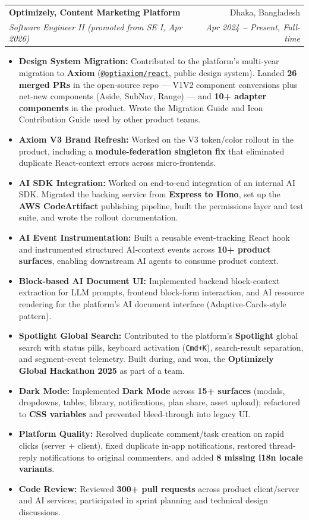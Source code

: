 \documentclass[letterpaper,11pt]{article}
\makeatletter
\newcommand{\resumeItem}[1]{
  \item\small{{#1 \vspace{-2pt}}}
}
\newcommand{\resumeSubheading}[4]{
  \vspace{-2pt}\item
    \begin{tabular*}{0.97\textwidth}[t]{l@{\extracolsep{\fill}}r}
      \textbf{#1} & #2 \\
      \textit{\small#3} & \textit{\small #4} \\
    \end{tabular*}\vspace{-7pt}
}
\newcommand{\resumeItemListStart}{\begin{itemize}}
\newcommand{\resumeItemListEnd}{\end{itemize}\vspace{-5pt}}
\makeatother
\begin{document}
    \resumeSubheading
      {Optimizely, Content Marketing Platform}{Dhaka, Bangladesh}
      {Software Engineer II \textnormal{(promoted from SE I, Apr 2026)}}{Apr 2024 \textbf{--} Present, Full-time}
      \resumeItemListStart
        \resumeItem{\textbf{Design System Migration:} Contributed to the platform's multi-year migration to \textbf{Axiom} (\href{https://github.com/optimizely-axiom/optiaxiom}{\color{blue}\texttt{@optiaxiom/react}}, public design system). Landed \textbf{26 merged PRs} in the open-source repo --- V1{\textrightarrow}V2 component conversions plus net-new components (Aside, SubNav, Range) --- and \textbf{10+ adapter components} in the product. Wrote the Migration Guide and Icon Contribution Guide used by other product teams.}
        \resumeItem{\textbf{Axiom V3 Brand Refresh:} Worked on the V3 token/color rollout in the product, including a \textbf{module-federation singleton fix} that eliminated duplicate React-context errors across micro-frontends.}
        \resumeItem{\textbf{AI SDK Integration:} Worked on end-to-end integration of an internal AI SDK. Migrated the backing service from \textbf{Express to Hono}, set up the \textbf{AWS CodeArtifact} publishing pipeline, built the permissions layer and test suite, and wrote the rollout documentation.}
        \resumeItem{\textbf{AI Event Instrumentation:} Built a reusable event-tracking React hook and instrumented structured AI-context events across \textbf{10+ product surfaces}, enabling downstream AI agents to consume product context.}
        \resumeItem{\textbf{Block-based AI Document UI:} Implemented backend block-context extraction for LLM prompts, frontend block-form interaction, and AI resource rendering for the platform's AI document interface (Adaptive-Cards-style pattern).}
        \resumeItem{\textbf{Spotlight Global Search:} Contributed to the platform's \textbf{Spotlight} global search with status pills, keyboard activation (\texttt{Cmd+K}), search-result separation, and segment-event telemetry. Built during, and won, the \textbf{Optimizely Global Hackathon 2025} as part of a team.}
        \resumeItem{\textbf{Dark Mode:} Implemented \textbf{Dark Mode} across \textbf{15+ surfaces} (modals, dropdowns, tables, library, notifications, plan share, asset upload); refactored to \textbf{CSS variables} and prevented bleed-through into legacy UI.}
        \resumeItem{\textbf{Platform Quality:} Resolved duplicate comment/task creation on rapid clicks (server + client), fixed duplicate in-app notifications, restored thread-reply notifications to original commenters, and added \textbf{8 missing i18n locale variants}.}
        \resumeItem{\textbf{Code Review:} Reviewed \textbf{300+ pull requests} across product client/server and AI services; participated in sprint planning and technical design discussions.}
      \resumeItemListEnd
\end{document}
